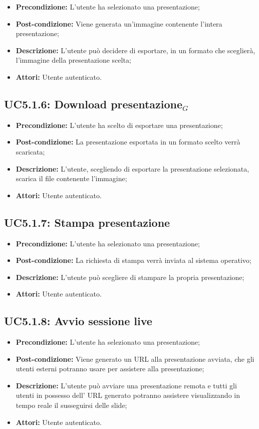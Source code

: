 \begin{itemize}
	\item \textbf{Precondizione:} L'utente ha selezionato una presentazione;
	\item \textbf{Post-condizione:} Viene generata un'immagine contenente l'intera presentazione;
	\item \textbf{Descrizione:} L'utente può decidere di esportare, in un formato che sceglierà, l'immagine della presentazione scelta;
	\item \textbf{Attori:} Utente autenticato.
\end{itemize}
\subsection{ UC5.1.6: Download presentazione$_G$}

\begin{itemize}
	\item \textbf{Precondizione:} L'utente ha scelto di esportare una presentazione;
	\item \textbf{Post-condizione:} La presentazione esportata in un formato scelto verrà scaricata;
	\item \textbf{Descrizione:} L'utente, scegliendo di esportare la presentazione selezionata, scarica il file contenente l'immagine;
	\item \textbf{Attori:} Utente autenticato.
\end{itemize}
\subsection{ UC5.1.7: Stampa presentazione }

\begin{itemize}
	\item \textbf{Precondizione:} L'utente ha selezionato una presentazione;
	\item \textbf{Post-condizione:} La richiesta di stampa verrà inviata al sistema operativo;
	\item \textbf{Descrizione:} L'utente può scegliere di stampare la propria presentazione;
	\item \textbf{Attori:} Utente autenticato.
\end{itemize}
\subsection{ UC5.1.8: Avvio sessione live}

\begin{itemize}
	\item \textbf{Precondizione:} L'utente ha selezionato una presentazione;
	\item \textbf{Post-condizione:} Viene generato un URL alla presentazione avviata, che gli utenti esterni potranno usare per assistere alla presentazione;
	\item \textbf{Descrizione:} L'utente può avviare una presentazione remota e tutti gli utenti in possesso dell' URL generato potranno assistere visualizzando in tempo reale il susseguirsi delle slide;
	\item \textbf{Attori:} Utente autenticato.
\end{itemize}

